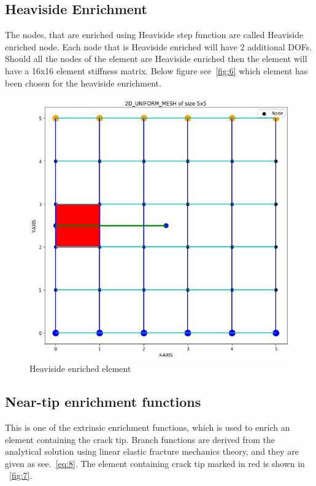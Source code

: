 \documentclass[fleqn, 12.5pt,a4paper]{report}
\begin{document}
\subsection{Heaviside Enrichment}
The nodes, that are enriched using Heaviside step function are called Heaviside enriched node. Each node that is Heaviside enriched will have 2 additional DOFs. Should all the nodes of the element are Heaviside enriched then the element will have a 16x16 element stiffness matrix. Below figure see~\autoref{fig:6} which element has been chosen for the heaviside enrichment.

\begin{figure}[h]
    \centering
    \includegraphics[scale = 0.30]{Heavy_enr.png}
    \caption{Heaviside enriched element}
    \label{fig:6}
\end{figure}

\subsection{Near-tip enrichment functions}
This is one of the extrinsic enrichment functions, which is used to enrich an element containing the crack tip. Branch functions are derived from the analytical solution using linear elastic fracture mechanics theory, and they are given as see.~\autoref{eq:8}. The element containing crack tip marked in red is shown in ~\autoref{fig:7}.
\end{document}
